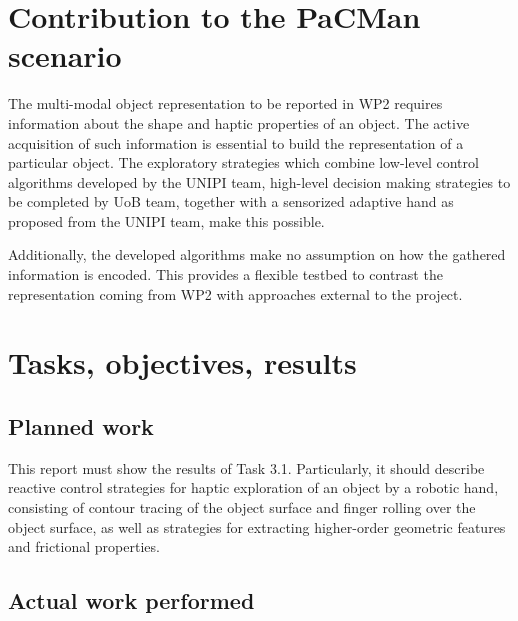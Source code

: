 \documentclass[a4paper,11pt,pdf]{pacmanreport}
\begin{document}
\section*{Contribution to the PaCMan scenario}

The multi-modal object representation to be reported in WP2 requires information about the shape and haptic properties of an object.
The active acquisition of such information is essential to build the representation of a particular object. The exploratory strategies which combine low-level control algorithms developed by the UNIPI team, high-level decision making strategies to be completed by UoB team, together with a sensorized adaptive hand as proposed from the UNIPI team, make this possible.

Additionally, the developed algorithms make no assumption on how the gathered information is encoded. This provides a flexible testbed to contrast the representation coming from WP2 with approaches external to the project.

\newpage

\section{Tasks, objectives, results}

\subsection{Planned work}

This report must show the results of Task 3.1. Particularly, it should describe reactive control strategies for haptic exploration of an object by a robotic hand, consisting of contour tracing of the object surface and finger rolling over the object surface, as well as strategies for extracting higher-order geometric features and frictional properties. 


\subsection{Actual work performed}
\end{document}
